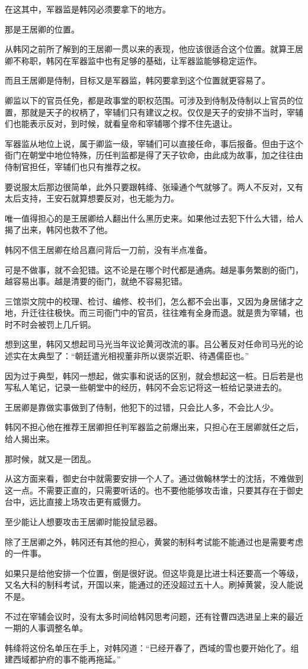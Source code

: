 在这其中，军器监是韩冈必须要拿下的地方。

那是王居卿的位置。

从韩冈之前所了解到的王居卿一贯以来的表现，他应该很适合这个位置。就算王居卿不称职，韩冈在军器监中也有足够的基础，让军器监能够稳定运作。

而且王居卿是侍制，目标又是军器监，韩冈要拿到这个位置就更容易了。

卿监以下的官员任免，都是政事堂的职权范围。可涉及到侍制及侍制以上官员的位置，那就是天子的权柄了，宰辅们只有建议之权。仅仅是天子的安排不当时，宰辅们也能表示反对，到时候，就看皇帝和宰辅哪个撑不住先退让。

军器监从地位上说，属于卿监一级，宰辅们可以直接任命，事后报备。但由于这个衙门在朝堂中地位特殊，历任判监都是得了天子钦命，由此成为故事，加之往往由侍制官担任，宰辅们也只有推荐之权。

要说服太后那边很简单，此外只要跟韩绛、张璪通个气就够了。两人不反对，又有太后支持，王安石就算想要反对，也无能为力。

唯一值得担心的是王居卿给人翻出什么黑历史来。如果他过去犯下什么大错，给人揭了出来，韩冈也救不了他。

韩冈不信王居卿在给吕嘉问背后一刀前，没有半点准备。

可是不做事，就不会犯错。这不论是在哪个时代都是通病。越是事务繁剧的衙门，越容易出事。越是清要的衙门，就绝不容易犯错。

三馆崇文院中的校理、检讨、编修、校书们，怎么都不会出事，又因为身居储才之地，升迁往往极快。而三司衙门中的官员，往往难有全身而退。就是贵为宰辅，也时不时会被罚上几斤铜。

想到这里，韩冈又想起司马光当年议论黄河改流的事。吕公著反对任命司马光的论述实在太典型了：“朝廷遣光相视董非所以褒崇近职、待遇儒臣也。”

因为过于典型，韩冈一想起，做实事和说话的区别，就会想起这一桩。日后若是也写私人笔记，记录一些朝堂中的经历，韩冈不会忘记将这一桩给记录进去的。

王居卿是靠做实事做到了侍制，他犯下的过错，只会比人多，不会比人少。

韩冈不担心他在推荐王居卿担任判军器监之前爆出来，只担心在王居卿就任之后，给人揭出来。

那时候，就又是一团乱。

从这方面来看，御史台中就需要安排一个人了。通过做翰林学士的沈括，不难做到这一点。不需要正直的，只需要听话的。也不要他能够攻击谁，只要其存在于御史台中，远比直接上场攻击更有威慑力。

至少能让人想要攻击王居卿时能投鼠忌器。

除了王居卿之外，韩冈还有其他的担心，黄裳的制科考试能不能通过也是需要考虑的一件事。

如果只是给他安排一个位置，倒是很好说。但这毕竟是比进士科还要高一个等级，又名大科的制科考试，开国以来，能通过的还没超过五十人。刷掉黄裳，没人能说不是。

不过在宰辅会议时，没有太多时间给韩冈思考问题，还有铨曹四选进呈上来的最近一期的人事调整名单。

韩绛将这份名单压在手上，对韩冈道：“已经开春了，西域的雪也要开始化了。组建西域都护府的事不能再拖延。”
